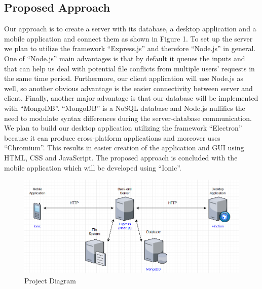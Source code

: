 \documentclass[11pt]{article}
\begin{document}
	\subsection{Proposed Approach}
	Our approach is to create a server with its database, a desktop application and a mobile application and connect them as shown in Figure 1. 
To set up the server we plan to utilize the framework “Express.js” and therefore “Node.js” in general. One of “Node.js” main advantages is that by default it queues the inputs and that can help us deal with potential file conflicts from multiple users’ requests in the same time period. Furthermore, our client application will use Node.js as well, so another obvious advantage is the easier connectivity between server and client. Finally, another major advantage is that our database will be implemented with “MongoDB”. “MongoDB” is a NoSQL database and Node.js nullifies the need to modulate syntax differences during the server-database communication. We plan to build our desktop application utilizing the framework “Electron” because it can produce cross-platform applications and moreover uses “Chromium”. This results in easier creation of the application and GUI using HTML, CSS and JavaScript. The proposed approach is concluded with the mobile application which will be developed using “Ionic”.
\begin{figure}[h]
\centering
\includegraphics[scale=0.7]{ProjectDiagram.png}
\caption{Project Diagram}
\end{figure}
\end{document}
